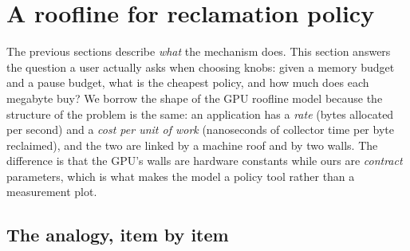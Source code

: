\section{A roofline for reclamation policy}
\label{sec:roofline}

The previous sections describe \emph{what} the mechanism does.
This section answers the question a user actually asks when choosing knobs: given a memory budget and a
pause budget, what is the cheapest policy, and how much does each megabyte buy?
We borrow the shape of the GPU roofline model \cite{williams2009roofline} because the structure of the
problem is the same: an application has a \emph{rate} (bytes allocated per second) and a \emph{cost
per unit of work} (nanoseconds of collector time per byte reclaimed), and the two are linked by a
machine roof and by two walls.
The difference is that the GPU's walls are hardware constants while ours are \emph{contract}
parameters, which is what makes the model a policy tool rather than a measurement plot.

\subsection{The analogy, item by item}
\label{sec:roofline-analogy}

\begin{table}[t]
\centering
\small
{}
\caption{The analogy, item by item. The only structural difference is that both walls are contract
parameters set by the user rather than hardware constants.}
\label{tab:roofline-map}
\end{table}

